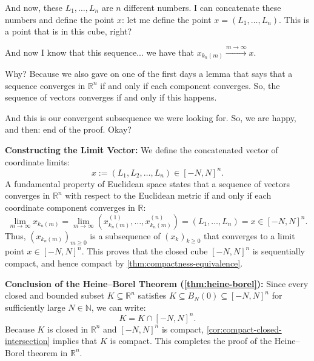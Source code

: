 \begin{proofWrapper}
\begin{speech}[01:05:21 - 01:07:14]
And now, these $L_1, \dots, L_n$ are $n$ different numbers. I can concatenate these numbers and define the point $x$:  let me define the point $x = (L_1, \dots, L_n)$. This is a point that is in this cube, right?

And now I know that this sequence... we have that $x_{k_n(m)} \xrightarrow{m \to \infty} x$. 

Why? Because we also gave on one of the first days a lemma that says that a sequence converges in $\mathbb{R}^n$ if and only if each component converges. So, the sequence of vectors converges if and only if this happens.

And this is our convergent subsequence we were looking for. So, we are happy, and then: end of the proof.  Okay?
\end{speech}

\begin{content}
\textbf{Constructing the Limit Vector:}
We define the concatenated vector of coordinate limits:
\begin{equation}\label{eq:limit-vector-cube}
x := (L_1, L_2, \dots, L_n) \in [-N, N]^n.
\end{equation}
A fundamental property of Euclidean space states that a sequence of vectors converges in $\mathbb{R}^n$ with respect to the Euclidean metric if and only if each coordinate component converges in $\mathbb{R}$:
\[
\lim_{m \to \infty} x_{k_n(m)} = \lim_{m \to \infty} \left( x_{k_n(m)}^{(1)}, \dots, x_{k_n(m)}^{(n)} \right) = (L_1, \dots, L_n) = x \in [-N, N]^n.
\]
Thus, $(x_{k_n(m)})_{m \ge 0}$ is a subsequence of $(x_k)_{k \ge 0}$ that converges to a limit point $x \in [-N, N]^n$. This proves that the closed cube $[-N, N]^n$ is sequentially compact, and hence compact by \cref{thm:compactness-equivalence}.

\par\vspace{1ex}\noindent
\textbf{Conclusion of the Heine--Borel Theorem (\cref{thm:heine-borel}):}
Since every closed and bounded subset $K \subseteq \mathbb{R}^n$ satisfies $K \subseteq B_N(0) \subseteq [-N, N]^n$ for sufficiently large $N \in \mathbb{N}$, we can write:
\[
K = K \cap [-N, N]^n.
\]
Because $K$ is closed in $\mathbb{R}^n$ and $[-N, N]^n$ is compact, \cref{cor:compact-closed-intersection} implies that $K$ is compact. This completes the proof of the Heine--Borel theorem in $\mathbb{R}^n$.
\end{content}

\end{proofWrapper}

